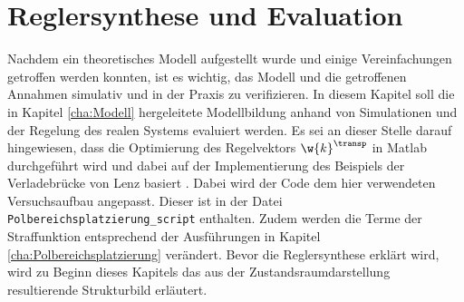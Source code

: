 \chapter{Reglersynthese und Evaluation}\label{cha:Simulation}
Nachdem ein theoretisches Modell aufgestellt wurde und einige Vereinfachungen getroffen werden konnten, ist es wichtig, das Modell und die getroffenen Annahmen simulativ und in der Praxis zu verifizieren. In diesem Kapitel soll die in Kapitel \ref{cha:Modell} hergeleitete Modellbildung anhand von Simulationen und der Regelung des realen Systems evaluiert werden. Es sei an dieser Stelle darauf hingewiesen, dass die Optimierung des Regelvektors $\w{k}^\transp$ in Matlab durchgeführt wird und dabei auf der Implementierung des Beispiels der Verladebrücke von Lenz basiert \cite{Lenz.2018}. Dabei wird der Code dem hier verwendeten Versuchsaufbau angepasst. Dieser ist in der Datei \texttt{Polbereichsplatzierung\_script} enthalten. Zudem werden die Terme der Straffunktion entsprechend der Ausführungen in Kapitel \ref{cha:Polbereichsplatzierung} verändert. Bevor die Reglersynthese erklärt wird, wird zu Beginn dieses Kapitels das aus der Zustandsraumdarstellung resultierende Strukturbild erläutert.


